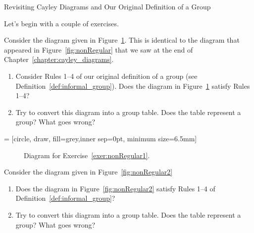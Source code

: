 \begin{section}{Revisiting Cayley Diagrams and Our Original Definition of a Group}%

Let's begin with a couple of exercises.

\begin{exercise}\label{exer:nonRegular1}%
Consider the diagram given in Figure~\ref{fig:nonRegularRepeat}.  This is identical to the diagram that appeared in Figure~\ref{fig:nonRegular} that we saw at the end of Chapter~\ref{chapter:cayley_diagrams}.
\begin{enumerate}[label=\rm{(\alph*)}]
\item Consider Rules 1--4 of our original definition of a group (see Definition~\ref{def:informal_group}).  Does the diagram in Figure~\ref{fig:nonRegularRepeat} satisfy Rules 1--4?
\item Try to convert this diagram into a group table.  Does the table represent a group? What goes wrong?
\end{enumerate}
\end{exercise}

 = [circle, draw, fill=grey,inner sep=0pt, minimum size=6.5mm]

\begin{figure}[!ht]
\centering
{}
\caption{Diagram for Exercise~\ref{exer:nonRegular1}.}
\label{fig:nonRegularRepeat}
\end{figure}

\begin{exercise}\label{exer:nonRegular2}%
Consider the diagram given in Figure~\ref{fig:nonRegular2}
\begin{enumerate}[label=\rm{(\alph*)}]
\item Does the diagram in Figure~\ref{fig:nonRegular2} satisfy Rules 1--4 of Definition~\ref{def:informal_group}?
\item Try to convert this diagram into a group table.  Does the table represent a group? What goes wrong?
\end{enumerate}
\end{exercise}


\end{section}
